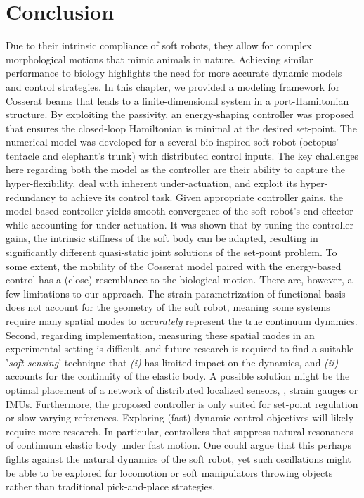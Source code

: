 \vspace{-3mm}
\section{Conclusion}
\label{sec:C3:conclusion}
Due to their intrinsic compliance of soft robots, they allow for complex morphological motions that mimic animals in nature. Achieving similar performance to biology highlights the need for more accurate dynamic models and control strategies. In this chapter, we provided a modeling framework for Cosserat beams that leads to a finite-dimensional system in a port-Hamiltonian structure. By exploiting the passivity, an energy-shaping controller was proposed that ensures the closed-loop Hamiltonian is minimal at the desired set-point. The numerical model was developed for a several bio-inspired soft robot (octopus' tentacle and elephant's trunk) with distributed control inputs. The key challenges here regarding both the model as the controller are their ability to capture the hyper-flexibility, deal with inherent under-actuation, and exploit its hyper-redundancy to achieve its control task. Given appropriate controller gains, the model-based controller yields smooth convergence of the soft robot's end-effector while accounting for under-actuation. It was shown that by tuning the controller gains, the intrinsic stiffness of the soft body can be adapted, resulting in significantly different quasi-static joint solutions of the set-point problem. To some extent, the mobility of the Cosserat model paired with the energy-based control has a (close) resemblance to the biological motion.  There are, however, a few limitations to our approach. The strain parametrization of functional basis does not account for the geometry of the soft robot, meaning some systems require many spatial modes to \textit{accurately} represent the true continuum dynamics. Second, regarding implementation, measuring these spatial modes in an experimental setting is difficult, and future research is required to find a suitable '\textit{soft sensing}' technique that  \textit{(i)} has limited impact on the dynamics, and \textit{(ii)} accounts for the continuity of the elastic body. A possible solution might be the optimal placement of a network of distributed localized sensors, \eg, strain gauges or IMUs. Furthermore, the proposed controller is only suited for set-point regulation or slow-varying references. Exploring (fast)-dynamic control objectives will likely require more research. In particular, controllers that suppress natural resonances of continuum elastic body under fast motion. One could argue that this perhaps fights against the natural dynamics of the soft robot, yet such oscillations might be able to be explored for locomotion or soft manipulators throwing objects rather than traditional pick-and-place strategies.


